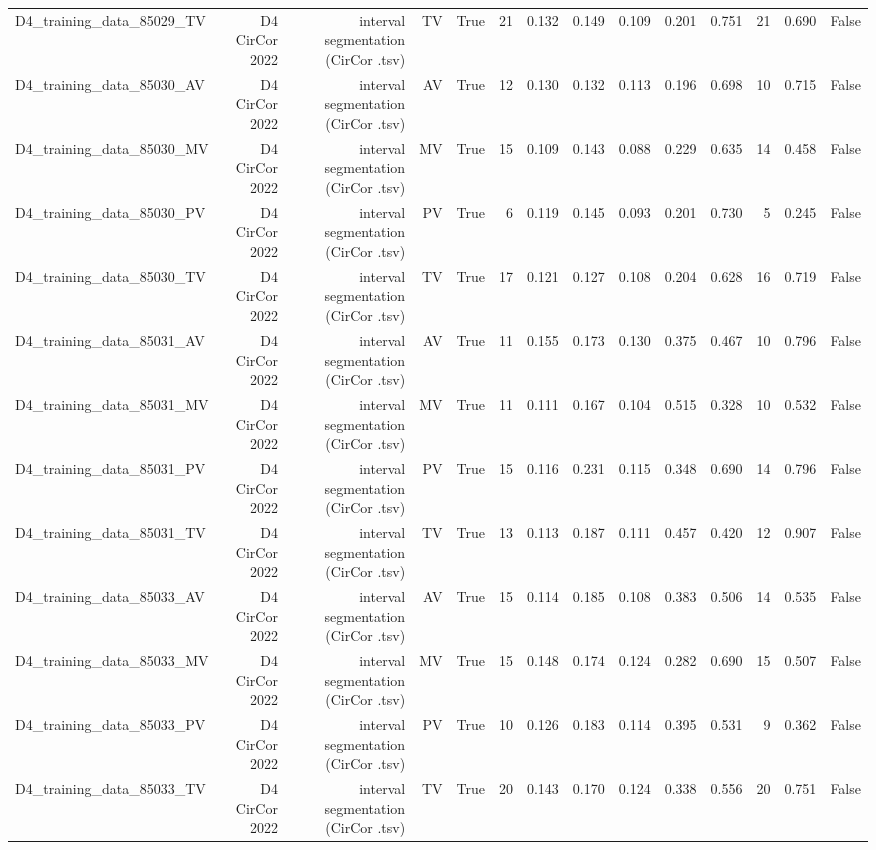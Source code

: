 \begin{table}[htbp]
\begin{tabular}{lrrrrrrrrrrrrr}
    D4\_training\_data\_85029\_TV & D4 CirCor 2022 & interval segmentation (CirCor .tsv) & TV & True & 21 & 0.132 & 0.149 & 0.109 & 0.201 & 0.751 & 21 & 0.690 & False \\
    D4\_training\_data\_85030\_AV & D4 CirCor 2022 & interval segmentation (CirCor .tsv) & AV & True & 12 & 0.130 & 0.132 & 0.113 & 0.196 & 0.698 & 10 & 0.715 & False \\
    D4\_training\_data\_85030\_MV & D4 CirCor 2022 & interval segmentation (CirCor .tsv) & MV & True & 15 & 0.109 & 0.143 & 0.088 & 0.229 & 0.635 & 14 & 0.458 & False \\
    D4\_training\_data\_85030\_PV & D4 CirCor 2022 & interval segmentation (CirCor .tsv) & PV & True & 6 & 0.119 & 0.145 & 0.093 & 0.201 & 0.730 & 5 & 0.245 & False \\
    D4\_training\_data\_85030\_TV & D4 CirCor 2022 & interval segmentation (CirCor .tsv) & TV & True & 17 & 0.121 & 0.127 & 0.108 & 0.204 & 0.628 & 16 & 0.719 & False \\
    D4\_training\_data\_85031\_AV & D4 CirCor 2022 & interval segmentation (CirCor .tsv) & AV & True & 11 & 0.155 & 0.173 & 0.130 & 0.375 & 0.467 & 10 & 0.796 & False \\
    D4\_training\_data\_85031\_MV & D4 CirCor 2022 & interval segmentation (CirCor .tsv) & MV & True & 11 & 0.111 & 0.167 & 0.104 & 0.515 & 0.328 & 10 & 0.532 & False \\
    D4\_training\_data\_85031\_PV & D4 CirCor 2022 & interval segmentation (CirCor .tsv) & PV & True & 15 & 0.116 & 0.231 & 0.115 & 0.348 & 0.690 & 14 & 0.796 & False \\
    D4\_training\_data\_85031\_TV & D4 CirCor 2022 & interval segmentation (CirCor .tsv) & TV & True & 13 & 0.113 & 0.187 & 0.111 & 0.457 & 0.420 & 12 & 0.907 & False \\
    D4\_training\_data\_85033\_AV & D4 CirCor 2022 & interval segmentation (CirCor .tsv) & AV & True & 15 & 0.114 & 0.185 & 0.108 & 0.383 & 0.506 & 14 & 0.535 & False \\
    D4\_training\_data\_85033\_MV & D4 CirCor 2022 & interval segmentation (CirCor .tsv) & MV & True & 15 & 0.148 & 0.174 & 0.124 & 0.282 & 0.690 & 15 & 0.507 & False \\
    D4\_training\_data\_85033\_PV & D4 CirCor 2022 & interval segmentation (CirCor .tsv) & PV & True & 10 & 0.126 & 0.183 & 0.114 & 0.395 & 0.531 & 9 & 0.362 & False \\
    D4\_training\_data\_85033\_TV & D4 CirCor 2022 & interval segmentation (CirCor .tsv) & TV & True & 20 & 0.143 & 0.170 & 0.124 & 0.338 & 0.556 & 20 & 0.751 & False \\

\end{tabular}
\end{table}
